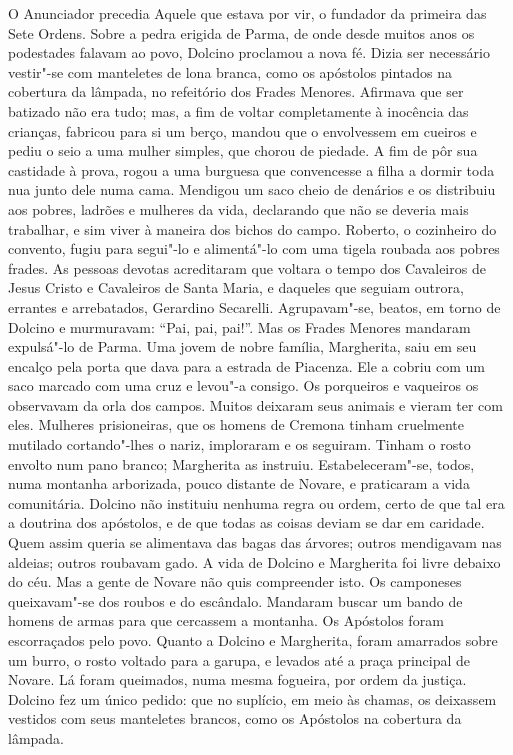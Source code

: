 O Anunciador precedia Aquele que estava por vir, o fundador da primeira das
Sete Ordens. Sobre a pedra erigida de Parma, de onde desde muitos anos os
podestades falavam ao povo, Dolcino proclamou a nova fé. Dizia ser
necessário vestir"-se com manteletes de lona branca, como os apóstolos
pintados na cobertura da lâmpada, no refeitório dos Frades Menores.
Afirmava que ser batizado não era tudo; mas, a fim de voltar completamente
à inocência das crianças, fabricou para si um berço, mandou que o
envolvessem em cueiros e pediu o seio a uma mulher simples, que chorou de
piedade. A fim de pôr sua castidade à prova, rogou a uma burguesa que
convencesse a filha a dormir toda nua junto dele numa cama. Mendigou um
saco cheio de denários e os distribuiu aos pobres, ladrões e mulheres da
vida, declarando que não se deveria mais trabalhar, e sim viver à maneira
dos bichos do campo. Roberto, o cozinheiro do convento, fugiu para
segui"-lo e alimentá"-lo com uma tigela roubada aos pobres frades. As
pessoas devotas acreditaram que voltara o tempo dos Cavaleiros de Jesus
Cristo e Cavaleiros de Santa Maria, e daqueles que seguiam outrora,
errantes e arrebatados, Gerardino Secarelli. Agrupavam"-se, beatos, em
torno de Dolcino e murmuravam: “Pai, pai, pai!”. Mas os Frades Menores
mandaram expulsá"-lo de Parma. Uma jovem de nobre família, Margherita, saiu
em seu encalço pela porta que dava para a estrada de Piacenza. Ele a
cobriu com um saco marcado com uma cruz e levou"-a consigo. Os porqueiros e
vaqueiros os observavam da orla dos campos. Muitos deixaram seus animais e
vieram ter com eles. Mulheres prisioneiras, que os homens de Cremona
tinham cruelmente mutilado cortando"-lhes o nariz, imploraram e os
seguiram. Tinham o rosto envolto num pano branco; Margherita as instruiu.
Estabeleceram"-se, todos, numa montanha arborizada, pouco distante de
Novare, e praticaram a vida comunitária. Dolcino não instituiu nenhuma
regra ou ordem, certo de que tal era a doutrina dos apóstolos, e de que
todas as coisas deviam se dar em caridade. Quem assim queria se alimentava
das bagas das árvores; outros mendigavam nas aldeias; outros roubavam
gado. A vida de Dolcino e Margherita foi livre debaixo do céu. Mas a gente
de Novare não quis compreender isto. Os camponeses queixavam"-se dos roubos
e do escândalo. Mandaram buscar um bando de homens de armas para que
cercassem a montanha. Os Apóstolos foram escorraçados pelo povo. Quanto a
Dolcino e Margherita, foram amarrados sobre um burro, o rosto voltado para
a garupa, e levados até a praça principal de Novare. Lá foram queimados,
numa mesma fogueira, por ordem da justiça. Dolcino fez um único pedido:
que no suplício, em meio às chamas, os deixassem vestidos com seus
manteletes brancos, como os Apóstolos na cobertura da lâmpada.

